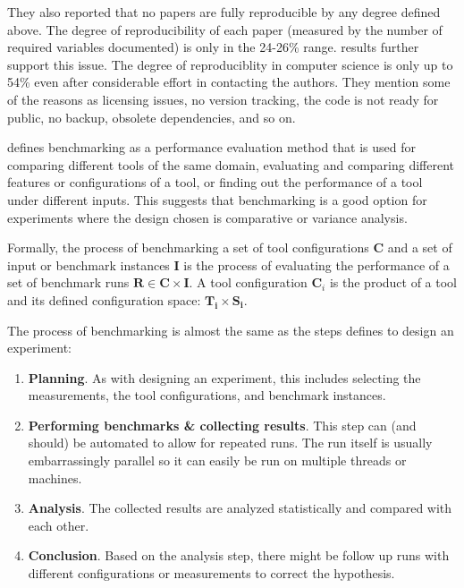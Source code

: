 They also reported that no papers are fully reproducible by any degree defined above.
The degree of reproducibility of each paper (measured by the number of required variables documented) is only in the 24-26\% range.
\citet{collbergRepeatabilityComputerSystems2016} results further support this issue.
The degree of reproduciblity in computer science is only up to 54\% even after considerable effort in contacting the authors.
They mention some of the reasons as licensing issues, no version tracking, the code is not ready for public, no backup, obsolete dependencies, and so on.

\citet{beyerReliableBenchmarkingRequirements2019} defines benchmarking as a performance evaluation method that is used for comparing different tools of the same domain, evaluating and comparing different features or configurations of a tool, or finding out the performance of a tool under different inputs.
This suggests that benchmarking is a good option for experiments where the design chosen is comparative or variance analysis.

Formally, the process of benchmarking a set of tool configurations $\bm{C}$ and a set of input or benchmark instances $\bm{I}$ is the process of evaluating the performance of a set of benchmark runs $\bm{R} \in \bm{C} \times \bm{I}$. A tool configuration $\bm{C}_i$ is the product of a tool and its defined configuration space: $\bm{T_i} \times \bm{S_i}$.

The process of benchmarking is almost the same as the steps \citet{montgomeryDesignAnalysisExperiments2013} defines to design an experiment:
\begin{enumerate}[noitemsep]
	\item \textbf{Planning}. As with designing an experiment, this includes selecting the measurements, the tool configurations, and benchmark instances.
	\item \textbf{Performing benchmarks \& collecting results}. This step can (and should) be automated to allow for repeated runs. The run itself is usually embarrassingly parallel so it can easily be run on multiple threads or machines.
	\item \textbf{Analysis}. The collected results are analyzed statistically and compared with each other.
	\item \textbf{Conclusion}. Based on the analysis step, there might be follow up runs with different configurations or measurements to correct the hypothesis.
\end{enumerate}

